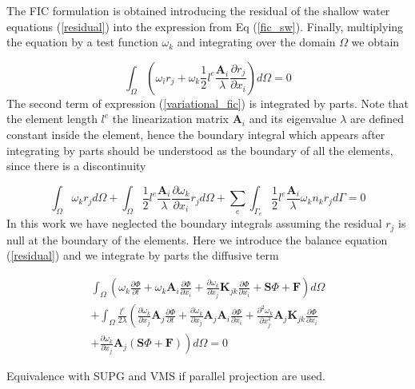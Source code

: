 \documentclass[a4paper,12pt]{article}
\newcommand{\pder}[2]{\frac{\partial#1}{\partial#2}}
\newcommand{\ppder}[2]{\frac{\partial^2#1}{\partial#2^2}}
\begin{document}
The FIC formulation is obtained introducing the residual of the shallow water equations (\ref{residual}) into the expression from Eq (\ref{fic_sw}). Finally, multiplying the equation by a test function $\omega_k$ and integrating over the domain $\Omega$ we obtain

\begin{equation} \label{variational_fic}
\int_\Omega \left(
    \omega_i r_j + \omega_k \frac{1}{2}l^e\frac{\mathbf{A}_i}{\lambda}\pder{r_j}{x_i}
\right) d\Omega = 0
\end{equation}
The second term of expression (\ref{variational_fic}) is integrated by parts. Note that the element length $l^e$ the linearization matrix $\mathbf{A}_i$ and its eigenvalue $\lambda$ are defined constant inside the element, hence the boundary integral which appears after integrating by parts should be understood as the boundary of all the elements, since there is a discontinuity

\begin{equation} \label{variational_fic_parts}
\int_\Omega \omega_k r_j d\Omega
+ \int_\Omega \frac{1}{2}l^e\frac{\mathbf{A}_i}{\lambda}\pder{\omega_k}{x_i} r_j d\Omega
+ \sum_e \int_{\Gamma_e} \frac{1}{2}l^e\frac{\mathbf{A}_i}{\lambda}\omega_kn_kr_j d\Gamma = 0
\end{equation}
In this work we have neglected the boundary integrals assuming the residual $r_j$ is null at the boundary of the elements. Here we introduce the balance equation (\ref{residual}) and we integrate by parts the diffusive term

\begin{multline} \label{variational_balance_fic}
\int_\Omega \left(
    \omega_k \pder{\Phi}{t} + \omega_k \mathbf{A}_i\pder{\Phi}{x_i}
    + \pder{\omega_k}{x_j} \mathbf{K}_{jk} \pder{\Phi}{x_i} + \mathbf{S}\Phi + \mathbf{F}
\right) d\Omega\\ +
\int_\Omega \frac{l^e}{2\lambda} \left(
    \pder{\omega_k}{x_j} \mathbf{A}_j \pder{\Phi}{t}
    + \pder{\omega_k}{x_j} \mathbf{A}_j\mathbf{A}_i\pder{\Phi}{x_i}
    + \ppder{\omega_k}{x_j} \mathbf{A}_j\mathbf{K}_{jk} \pder{\Phi}{x_i} \right. \\
    \left.
    + \pder{\omega_k}{x_j} \mathbf{A}_j(\mathbf{S}\Phi + \mathbf{F})
\right) d\Omega
=0
\end{multline}

\begin{framed}
Equivalence with SUPG and VMS if parallel projection are used.
\end{framed}
\end{document}
